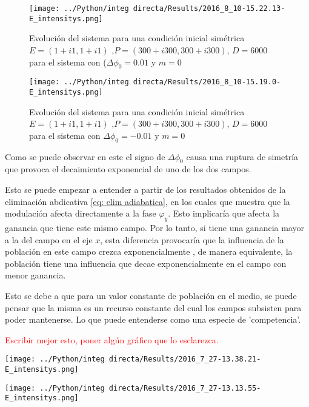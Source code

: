 		\begin{figure}[htc]
			\texttt{[image: ../Python/integ directa/Results/2016\_8\_10-15.22.13-E\_intensitys.png]}
			\caption{Evolución del sistema para una condición inicial simétrica $E=(1+i1,1+i1)$ ,$ P=(300+i300,300+i300)$, $D=6000$ para el sistema con ($\Delta \phi_0=0.01$ y  $m=0$}
			\label{fig: ci delta phi 0.01}
		\end{figure}
		\begin{figure}[htc]
			\texttt{[image: ../Python/integ directa/Results/2016\_8\_10-15.19.0-E\_intensitys.png]}
			\caption{Evolución del sistema para una condición inicial simétrica $E=(1+i1,1+i1)$ ,$ P=(300+i300,300+i300)$, $D=6000$ para el sistema con $\Delta \phi_0=-0.01$ y $m=0$}
			\label{fig: ci delta phi -0.01}
		\end{figure}
		
	Como se puede observar en este el signo de $\Delta \phi_0$ causa una ruptura de simetría que provoca el decaimiento exponencial de uno de los dos campos.
	
	Esto se puede empezar a entender a partir de los resultados obtenidos de la eliminación abdicativa \ref{eq: elim adiabatica}, en los cuales que muestra que la modulación afecta directamente a la fase $\varphi_y$. Esto implicaría que afecta la ganancia que tiene este mismo campo. Por lo tanto, si tiene una ganancia mayor a la del campo en el eje $x$, esta diferencia provocaría que la influencia de la población en este campo crezca exponencialmente , de manera equivalente, la población tiene una influencia que decae exponencialmente en el campo con menor ganancia.
	
	Esto se debe a que para un valor constante de población en el medio, se puede pensar que la misma es un recurso constante del cual los campos subsisten para poder mantenerse. Lo que puede entenderse como una especie de  'competencia'.
	
	\textcolor{red}{Escribir mejor esto, poner algún gráfico que lo esclarezca.}	
	
		
		\begin{center}
			\texttt{[image: ../Python/integ directa/Results/2016\_7\_27-13.38.21-E\_intensitys.png]}
		\end{center}
		
		
		
		\begin{center}
			\texttt{[image: ../Python/integ directa/Results/2016\_7\_27-13.13.55-E\_intensitys.png]}
		\end{center}
		

